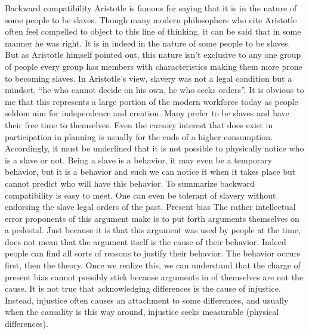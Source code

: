 Backward compatibility
Aristotle is famous for saying that it is in the nature of some people to be slaves. Though many modern philosophers who cite Aristotle often feel compelled to object to this line of thinking, it can be said that in some manner he was right. It is in indeed in the nature of some people to be slaves. But as Aristotle himself pointed out, this nature isn’t exclusive to any one group of people every group has members with characteristics making them more prone to becoming slaves.
In Aristotle’s view, slavery was not a legal condition but a mindset, “he who cannot decide on his own, he who seeks orders”. It is obvious to me that this represents a large portion of the modern workforce today as people seldom aim for independence and creation. Many prefer to be slaves and have their free time to themselves. Even the cursory interest that does exist in participation in planning is usually for the ends of a higher consumption. 
Accordingly, it must be underlined that it is not possible to physically notice who is a slave or not. Being a slave is a behavior, it may even be a temporary behavior, but it is a behavior and such we can notice it when it takes place but cannot predict who will have this behavior.
To summarize backward compatibility is easy to meet. One can even be tolerant of slavery without endorsing the slave legal orders of the past.
Present bias
The rather intellectual error proponents of this argument make is to put forth arguments themselves on a pedestal. Just because it is that this argument was used by people at the time, does not mean that the argument itself is the cause of their behavior. Indeed people can find all sorts of reasons to justify their behavior. The behavior occurs first, then the theory.
Once we realize this, we can understand that the charge of present bias cannot possibly stick because arguments in of themselves are not the cause.
It is not true that acknowledging differences is the cause of injustice. Instead, injustice often causes an attachment to some differences, and usually when the causality is this way around, injustice seeks measurable (physical differences).


 
